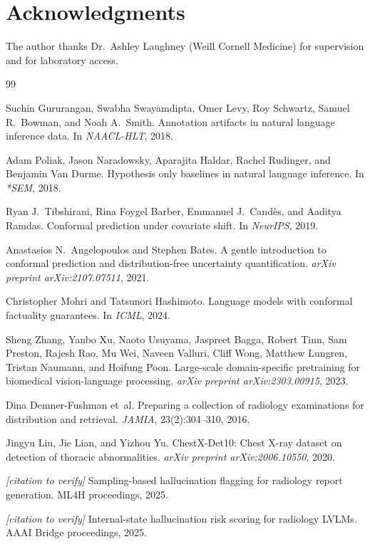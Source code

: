 \documentclass[11pt]{article}
\begin{document}
\section*{Acknowledgments}

The author thanks Dr.\ Ashley Laughney (Weill Cornell Medicine) for supervision and for laboratory access.

\begin{thebibliography}{99}
\footnotesize

Suchin Gururangan, Swabha Swayamdipta, Omer Levy, Roy Schwartz, Samuel R.\ Bowman, and Noah A.\ Smith.
\newblock Annotation artifacts in natural language inference data.
\newblock In \emph{NAACL-HLT}, 2018.

Adam Poliak, Jason Naradowsky, Aparajita Haldar, Rachel Rudinger, and Benjamin Van Durme.
\newblock Hypothesis only baselines in natural language inference.
\newblock In \emph{*SEM}, 2018.

Ryan J.\ Tibshirani, Rina Foygel Barber, Emmanuel J.\ Cand\`es, and Aaditya Ramdas.
\newblock Conformal prediction under covariate shift.
\newblock In \emph{NeurIPS}, 2019.

Anastasios N.\ Angelopoulos and Stephen Bates.
\newblock A gentle introduction to conformal prediction and distribution-free uncertainty quantification.
\newblock \emph{arXiv preprint arXiv:2107.07511}, 2021.

Christopher Mohri and Tatsunori Hashimoto.
\newblock Language models with conformal factuality guarantees.
\newblock In \emph{ICML}, 2024.

Sheng Zhang, Yanbo Xu, Naoto Usuyama, Jaspreet Bagga, Robert Tinn, Sam Preston, Rajesh Rao, Mu Wei, Naveen Valluri, Cliff Wong, Matthew Lungren, Tristan Naumann, and Hoifung Poon.
\newblock Large-scale domain-specific pretraining for biomedical vision-language processing.
\newblock \emph{arXiv preprint arXiv:2303.00915}, 2023.

Dina Demner-Fushman et~al.
\newblock Preparing a collection of radiology examinations for distribution and retrieval.
\newblock \emph{JAMIA}, 23(2):304--310, 2016.

Jingyu Liu, Jie Lian, and Yizhou Yu.
\newblock ChestX-Det10: Chest X-ray dataset on detection of thoracic abnormalities.
\newblock \emph{arXiv preprint arXiv:2006.10550}, 2020.

\textit{[citation to verify]} Sampling-based hallucination flagging for radiology report generation.
\newblock ML4H proceedings, 2025.

\textit{[citation to verify]} Internal-state hallucination risk scoring for radiology LVLMs.
\newblock AAAI Bridge proceedings, 2025.

\end{thebibliography}
\end{document}
